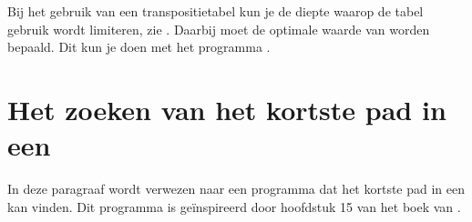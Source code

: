 \begin{cpplstShortInline}
Bij het gebruik van een transpositietabel kun je de diepte waarop de tabel gebruik wordt limiteren, zie .
Daarbij moet de optimale waarde van  worden bepaald.
Dit kun je doen met het programma .

\end{cpplstShortInline}

\section{Het zoeken van het kortste pad in een }

In deze paragraaf wordt verwezen naar een programma dat het kortste pad in een  kan vinden.
Dit programma is geïnspireerd door hoofdstuk 15 van het boek  van \citeauthor{Weiss1999}\cite{Weiss1999}.


